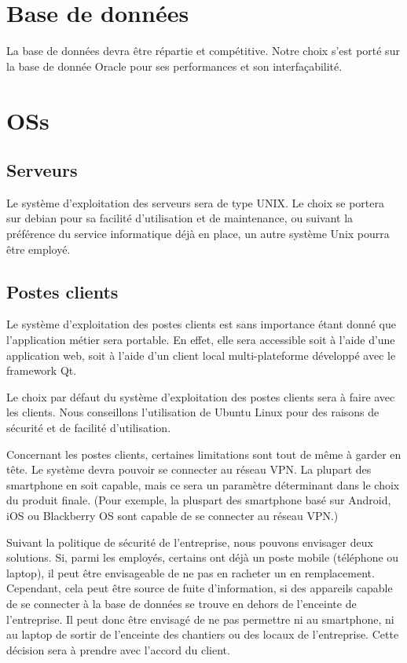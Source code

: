 \section{Base de données}
    La base de données devra être répartie et compétitive.
    Notre choix s'est porté sur la base de donnée Oracle pour ses performances et son interfaçabilité.

\section{OSs}
    \subsection{Serveurs}
        Le système d'exploitation des serveurs sera de type UNIX.
        Le choix se portera sur debian pour sa facilité d'utilisation et de maintenance, ou suivant la préférence du service informatique déjà en place, un autre système Unix pourra être employé.
    \subsection{Postes clients}
        Le système d'exploitation des postes clients est sans importance étant donné que l'application métier sera portable. En effet, elle sera accessible soit à l'aide d'une application web, soit à l'aide d'un client local multi-plateforme développé avec le framework Qt.

        Le choix par défaut du système d'exploitation des postes clients sera à faire avec les clients. Nous conseillons l'utilisation de Ubuntu Linux pour des raisons de sécurité et de facilité d'utilisation.

        Concernant les postes clients, certaines limitations sont tout de même à garder en tête. Le système devra pouvoir se connecter au réseau VPN. La plupart des smartphone en soit capable, mais ce sera un paramètre déterminant dans le choix du produit finale.
        (Pour exemple, la pluspart des smartphone basé sur Android, iOS ou Blackberry OS sont capable de se connecter au réseau VPN.)

        Suivant la politique de sécurité de l'entreprise, nous pouvons envisager deux solutions.
        Si, parmi les employés, certains ont déjà un poste mobile (téléphone ou laptop), il peut être envisageable de ne pas en racheter un en remplacement. Cependant, cela peut être source de fuite d'information, si des appareils capable de se connecter à la base de données se trouve en dehors de l'enceinte de l'entreprise.
        Il peut donc être envisagé de ne pas permettre ni au smartphone, ni au laptop de sortir de l'enceinte des chantiers ou des locaux de l'entreprise. Cette décision sera à prendre avec l'accord du client.
